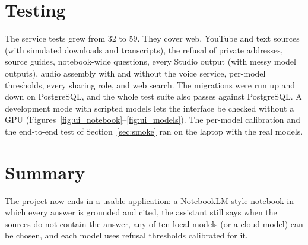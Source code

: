 \section{Testing}
The service tests grew from 32 to 59. They cover web, YouTube and text sources (with simulated downloads and transcripts), the refusal of private addresses, source guides, notebook-wide questions, every Studio output (with messy model outputs), audio assembly with and without the voice service, per-model thresholds, every sharing role, and web search. The migrations were run up and down on PostgreSQL, and the whole test suite also passes against PostgreSQL. A development mode with scripted models lets the interface be checked without a GPU (Figures~\ref{fig:ui_notebook}--\ref{fig:ui_models}). The per-model calibration and the end-to-end test of Section~\ref{sec:smoke} ran on the laptop with the real models.

\section{Summary}
The project now ends in a usable application: a NotebookLM-style notebook in which every answer is grounded and cited, the assistant still says when the sources do not contain the answer, any of ten local models (or a cloud model) can be chosen, and each model uses refusal thresholds calibrated for it.
